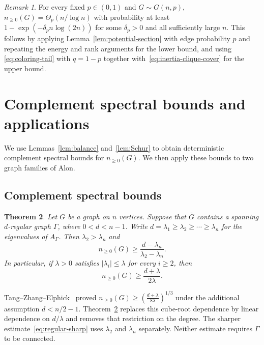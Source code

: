 \documentclass[11pt]{article}
\numberwithin{equation}{section}
\newtheorem{theorem}{Theorem}[section]
\theoremstyle{definition}
\theoremstyle{remark}
\newtheorem{remark}[theorem]{Remark}
\begin{document}
\begin{remark}
For every fixed $p\in(0,1)$ and $G\sim G(n,p)$,
$n_{\geq0}(G)=\Theta_p(n/\log n)$ with probability at least
$1-\exp(-\delta_p n\log(2n))$ for some $\delta_p>0$ and all
sufficiently large $n$.
This follows by applying Lemma~\ref{lem:potential-section} with edge
probability $p$ and repeating the energy and rank arguments for the
lower bound, and using
\eqref{eq:coloring-tail} with $q=1-p$ together
with~\eqref{eq:inertia-clique-cover} for the upper bound.
\end{remark}

\section{Complement spectral bounds and applications}
\label{sec:concluding}

We use Lemmas~\ref{lem:balance} and~\ref{lem:Schur} to obtain
deterministic complement spectral bounds for $n_{\geq0}(G)$.
We then apply these bounds to two graph families of Alon.

\subsection{Complement spectral bounds}\label{sec:spectral}

\begin{theorem}
\label{thm:regular}
Let $G$ be a graph on $n$ vertices. Suppose that $\overline G$
contains a spanning $d$-regular graph $\Gamma$, where
$0<d<n-1$. Write
$d=\lambda_1\geq\lambda_2\geq\cdots\geq\lambda_n$
for the eigenvalues of $A_\Gamma$. Then
$\lambda_2>\lambda_n$ and
\begin{equation}\label{eq:regular-sharp}
 n_{\geq0}(G)\geq
 \frac{d-\lambda_n}{\lambda_2-\lambda_n}.
\end{equation}
In particular, if $\lambda>0$ satisfies
$|\lambda_i|\leq\lambda$ for every $i\geq2$, then
\begin{equation}\label{eq:regular-simple}
 n_{\geq0}(G)\geq\frac{d+\lambda}{2\lambda}.
\end{equation}
\end{theorem}

Tang--Zhang--Elphick~\cite[Theorem~1.4]{TZE} proved
$n_{\geq0}(G)\geq \left(\frac{d+\lambda}{8\lambda}\right)^{1/3}$
under the additional assumption $d<n/2-1$.
Theorem~\ref{thm:regular} replaces this cube-root dependence by
linear dependence on $d/\lambda$ and removes that restriction
on the degree.
The sharper estimate~\eqref{eq:regular-sharp} uses $\lambda_2$
and $\lambda_n$ separately. Neither estimate requires $\Gamma$
to be connected.
\end{document}

